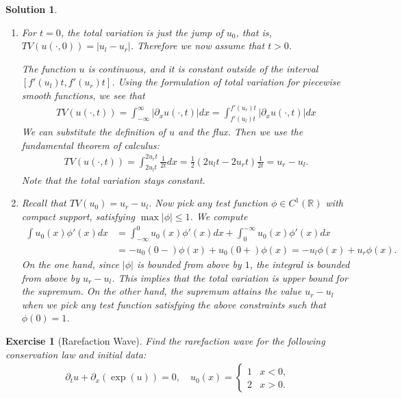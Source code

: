 \documentclass[10pt,letterpaper]{article}
\theoremstyle{break}
\newtheorem{exercise}{Exercise}
\newtheorem{mysolution}{Solution}
\newenvironment{solution}{\begin{mysolution}}{\end{mysolution}}
\begin{document}
\begin{solution}
    \begin{enumerate}
     \item 
     For $t = 0$, the total variation is just the jump of $u_0$, that is, $TV(u(\cdot,0)) = |u_l - u_r|$.
     Therefore we now assume that $t > 0$.
     
     The function $u$ is continuous, and it is constant outside of the interval $[ f'(u_l)t, f'(u_r)t ]$.
     Using the formulation of total variation for piecewise smooth functions, we see that 
     \begin{align}
      TV(u(\cdot,t))
      =
      \int_{-\infty}^{\infty} | \partial_x u(\cdot,t) | dx
      =
      \int_{f'(u_l)t}^{f'(u_r)t} | \partial_x u(\cdot,t) | dx
     \end{align}
     We can substitute the definition of $u$ and the flux. Then we use the fundamental theorem of calculus:
     \begin{align}
      TV(u(\cdot,t))
      =
      \int_{2 u_l t}^{2 u_r t} \frac 1 {2t} dx
      =
      \frac 1 2 ( 2 u_l t - 2 u_r t ) \frac 1 {2t}
      =
      u_r - u_l.
     \end{align}
     Note that the total variation stays constant. 
    
     
     \item Recall that $TV(u_{0}) = u_r - u_l$. Now pick any test function $\phi \in C^{1}(\mathbb R)$ with compact support, satisfying $\max |\phi| \leq 1$.
     We compute 
     \begin{align}
      \int u_0(x) \phi'(x) dx
      &
      =
      \int_{-\infty}^{0} u_0(x) \phi'(x) dx
      +
      \int_{0}^{-\infty} u_0(x) \phi'(x) dx
      \\&
      =
      -
      u_0(0-) \phi(x)
      +
      u_0(0+) \phi(x)
      =
      -
      u_l \phi(x)
      +
      u_r \phi(x)
      .
     \end{align}
     On the one hand, since $|\phi|$ is bounded from above by $1$, the integral is bounded from above by $u_r - u_l$.
     This implies that the total variation is upper bound for the supremum.
     On the other hand, the supremum attains the value $u_r - u_l$ when we pick any test function satisfying the above constraints 
     such that $\phi(0) = 1$. 
    \end{enumerate}
\end{solution}





\begin{exercise}[Rarefaction Wave]
    Find the rarefaction wave for the following conservation law and initial data:
    \begin{align}
     \partial_t u + \partial_x \left( \exp(u) \right) = 0,
     \quad 
     u_{0}(x)
     = 
     \left\{
     \begin{array}{cc}
        1 & x < 0,
        \\
        2 & x > 0.
     \end{array}
     \right.
    \end{align}
\end{exercise}
\end{document}
